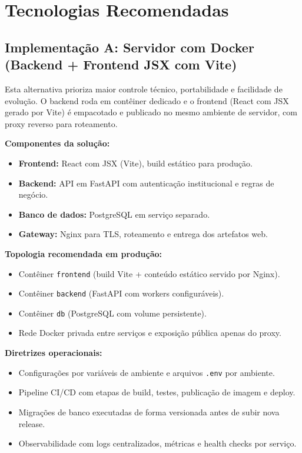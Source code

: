 \documentclass[12pt,a4paper]{article}
\begin{document}
\section{Tecnologias Recomendadas}

\subsection{Implementação A: Servidor com Docker (Backend + Frontend JSX com Vite)}
Esta alternativa prioriza maior controle técnico, portabilidade e facilidade de evolução. O backend roda em contêiner dedicado e o frontend (React com JSX gerado por Vite) é empacotado e publicado no mesmo ambiente de servidor, com proxy reverso para roteamento.

\textbf{Componentes da solução:}
\begin{itemize}[leftmargin=*]
  \item \textbf{Frontend:} React com JSX (Vite), build estático para produção.
  \item \textbf{Backend:} API em FastAPI com autenticação institucional e regras de negócio.
  \item \textbf{Banco de dados:} PostgreSQL em serviço separado.
  \item \textbf{Gateway:} Nginx para TLS, roteamento e entrega dos artefatos web.
\end{itemize}

\textbf{Topologia recomendada em produção:}
\begin{itemize}[leftmargin=*]
  \item Contêiner \texttt{frontend} (build Vite + conteúdo estático servido por Nginx).
  \item Contêiner \texttt{backend} (FastAPI com workers configuráveis).
  \item Contêiner \texttt{db} (PostgreSQL com volume persistente).
  \item Rede Docker privada entre serviços e exposição pública apenas do proxy.
\end{itemize}

\textbf{Diretrizes operacionais:}
\begin{itemize}[leftmargin=*]
  \item Configurações por variáveis de ambiente e arquivos \texttt{.env} por ambiente.
  \item Pipeline CI/CD com etapas de build, testes, publicação de imagem e deploy.
  \item Migrações de banco executadas de forma versionada antes de subir nova release.
  \item Observabilidade com logs centralizados, métricas e health checks por serviço.
\end{itemize}
\end{document}

